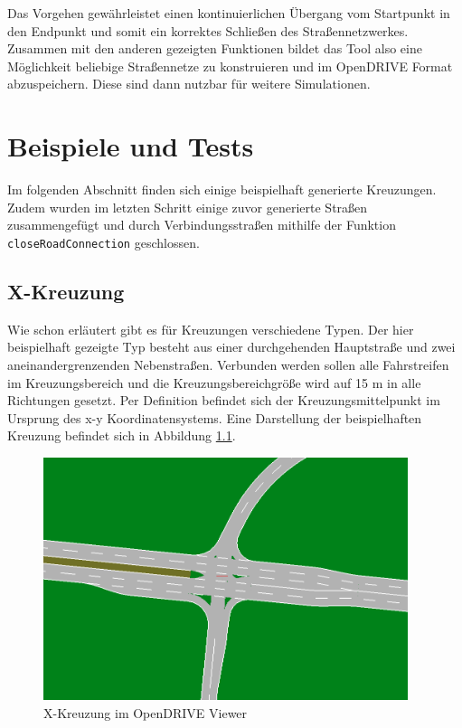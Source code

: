 Das Vorgehen gewährleistet einen kontinuierlichen Übergang vom Startpunkt in den Endpunkt und somit ein korrektes Schließen des Straßennetzwerkes. Zusammen mit den anderen gezeigten Funktionen bildet das Tool also eine Möglichkeit beliebige Straßennetze zu konstruieren und im OpenDRIVE Format abzuspeichern. Diese sind dann nutzbar für weitere Simulationen.

\chapter{Beispiele und Tests}

Im folgenden Abschnitt finden sich einige beispielhaft generierte Kreuzungen. Zudem wurden im letzten Schritt einige zuvor generierte Straßen zusammengefügt und durch Verbindungsstraßen mithilfe der Funktion \texttt{closeRoadConnection} geschlossen.

\section{X-Kreuzung}
Wie schon erläutert gibt es für Kreuzungen verschiedene Typen. Der hier beispielhaft gezeigte Typ besteht aus einer durchgehenden Hauptstraße und zwei aneinandergrenzenden Nebenstraßen. Verbunden werden sollen alle Fahrstreifen im Kreuzungsbereich und die Kreuzungsbereichgröße wird auf 15 m in alle Richtungen gesetzt. Per Definition befindet sich der Kreuzungsmittelpunkt im Ursprung des x-y Koordinatensystems. Eine Darstellung der beispielhaften Kreuzung befindet sich in Abbildung \ref{abb6}.

\begin{figure}[H]
\flushleft
\includegraphics[width=0.95\textwidth]{fig/junction4.png}
\caption{X-Kreuzung im OpenDRIVE Viewer}
\label{abb6}
\end{figure}


